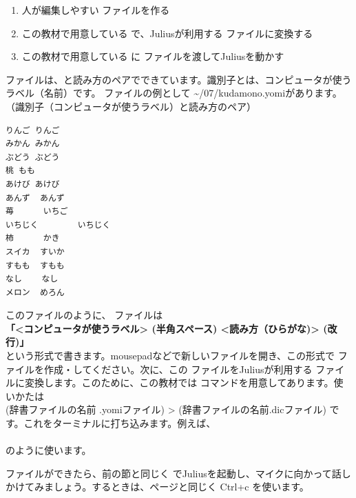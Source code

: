 \documentclass[text06.tex]{subfiles}
\begin{document}
\begin{enumerate}
\item 人が編集しやすい  ファイルを作る
\item この教材で用意している \mbox{} で、Juliusが利用する  ファイルに変換する
\item この教材で用意している  に  ファイルを渡してJuliusを動かす
\end{enumerate}

 ファイルは、と読み方のペアでできています。識別子とは、コンピュータが使うラベル（名前）です。 ファイルの例として \textasciitilde /07/\mbox{kudamono.yomi}があります。\\

（識別子（コンピュータが使うラベル）と読み方のペア）


\begin{lstlisting}[caption=kudamono.yomi,label=kudamono.yomi]
りんご りんご
みかん みかん
ぶどう ぶどう
桃 もも
あけび あけび
あんず  あんず
苺      いちご
いちじく        いちじく
柿      かき
スイカ  すいか
すもも  すもも
なし    なし
メロン  めろん
\end{lstlisting}

このファイルのように、 ファイルは\\
\textbf{「<コンピュータが使うラベル> (半角スペース) <読み方（ひらがな)> (改行)」}\\
という形式で書きます。mousepadなどで新しいファイルを開き、この形式で ファイルを作成・してください。次に、この ファイルをJuliusが利用する  ファイルに変換します。このために、この教材では \mbox{} コマンドを用意してあります。使いかたは\\
\mbox{} (辞書ファイルの名前 .yomiファイル) > (辞書ファイルの名前.dicファイル)
です。これをターミナルに打ち込みます。例えば、\\
\mbox{}\\
のように使います。

\enlargethispage{2\baselineskip}
 ファイルができたら、前の節と同じく \mbox{} でJuliusを起動し、マイクに向かって話しかけてみましょう。するときは、\pageref{Julius}ページと同じく Ctrl+c を使います。
\end{document}
